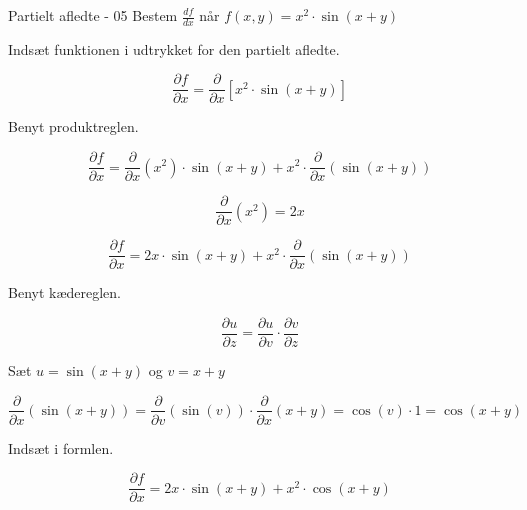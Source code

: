 \documentclass{article}
\begin{document}
\begin{exercise}{Partielt afledte - 05}
	Bestem $\frac{df}{dx}$ når $f(x,y) = x^2 \cdot \sin(x+y)$ 
	
	
	\hint
	Indsæt funktionen i udtrykket for den partielt afledte.
	
	\hint
	
	\[
	\frac{\partial f}{\partial x} = \frac{\partial }{\partial x} \left[ x^2 \cdot \sin(x+y) \right]
	\]
	
	\hint
	
	Benyt produktreglen.
	
	\hint
	\[
	\frac{\partial f}{\partial x} = \frac{\partial }{\partial x}\left(x^2 \right) \cdot \sin(x+y)+ x^2 \cdot \frac{\partial}{\partial x} \left( \sin(x+y)\right) 
	\]
	
	\hint
	\[\frac{\partial }{\partial x} \left(x^2\right) = 2x
	\]
	
	\hint
	\[
	\frac{\partial f}{\partial x} = 2x \cdot \sin(x+y)+ x^2 \cdot \frac{\partial}{\partial x} \left( \sin(x+y)\right) 
	\]	

	\hint
	Benyt kædereglen. 
	
	\hint
	\[
	\frac{\partial u}{\partial z} = \frac{\partial u}{\partial v} \cdot \frac{\partial v}{\partial z}
	\]
	
	\hint
	Sæt $u=\sin(x+y)$ og $v = x+y$
	
	\hint
	\[
	\frac{\partial}{\partial x} \left( \sin(x+y)\right) = \frac{\partial}{\partial v} \left( \sin(v) \right) \cdot \frac{\partial}{\partial x} (x+y) = \cos(v) \cdot 1 = \cos(x+y)
	\]
	
	\hint
	Indsæt i formlen.
	
	\hint
	\[
	\frac{\partial f}{\partial x} = 2x \cdot \sin(x+y)+ x^2 \cdot \cos(x+y)
	\]	

	
\end{exercise}

\newpage
\end{document}
